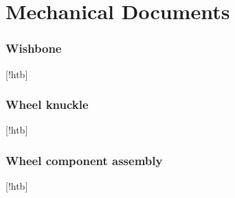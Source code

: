\chapter{Mechanical Documents}
\label{App:mech}
\pagestyle{duncan}

\subsection{Wishbone}
[!htb]
\subsection{Wheel knuckle}
[!htb]
\subsection{Wheel component assembly}
[!htb]